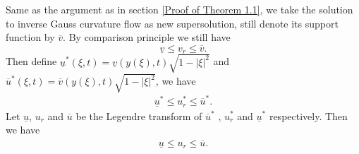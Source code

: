 \documentclass[reqno]{amsart}
\theoremstyle{remark}
\theoremstyle{definition}
\numberwithin{equation}{section}
\begin{document}
Same as the argument as in section \ref{Proof of Theorem 1.1}, we take the solution to inverse Gauss curvature flow as new supersolution, still denote its support function by $\overline{v}$. By comparison principle we still have
\[
\underline{v} \leqslant v_r \leqslant \overline{v}.
\]
Then define $\underline{u}^*(\xi, t) = \underline{v}(y(\xi), t) \sqrt{1 - |\xi |^2}$ and $\overline{u}^*(\xi, t) = \overline{v}(y(\xi), t) \sqrt{1 - |\xi |^2}$, we have
\begin{align*}
    \underline{u}^* \leqslant u_r^* \leqslant \overline{u}^*.
\end{align*}
Let $\underline{u}$, $u_r$ and $\overline{u}$ be the Legendre transform of $\overline{u}^*$ , $u_r^*$ and $\underline{u}^*$ respectively. Then we have
\begin{align*}
    \underline{u} \leqslant u_r \leqslant \overline{u}.
\end{align*}


\end{document}
